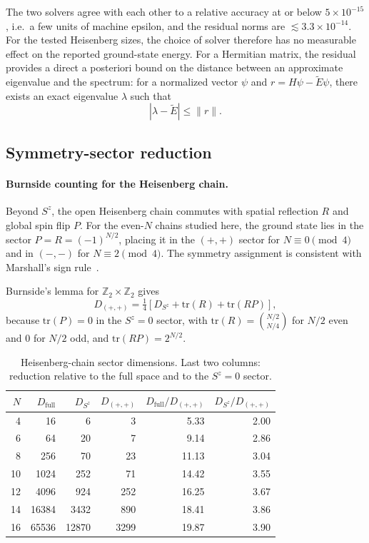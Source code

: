 \documentclass[pdflatex,sn-mathphys-num]{sn-jnl}
\begin{document}
The two solvers agree with each other to a relative accuracy at or
below $5 \times 10^{-15}$, i.e.\ a few units of machine epsilon, and
the residual norms are $\lesssim 3.3 \times 10^{-14}$. For the tested
Heisenberg sizes, the choice of solver therefore has no measurable
effect on the reported ground-state energy. For a Hermitian matrix,
the residual provides a direct a posteriori bound on the distance
between an approximate eigenvalue and the spectrum: for a normalized
vector $\psi$ and $r = H\psi - \tilde E\psi$, there exists an exact
eigenvalue $\lambda$ such that
\begin{equation}
|\lambda - \tilde E| \le \|r\|.
\label{eq:hermitian-bound}
\end{equation}

\subsection{Symmetry-sector reduction}
\label{sec:symmetry}

\paragraph{Burnside counting for the Heisenberg chain.}
Beyond $S^z$, the open Heisenberg chain commutes with spatial
reflection $R$ and global spin flip $P$. For the even-$N$ chains
studied here, the ground state lies in the sector
$P = R = (-1)^{N/2}$, placing it in the $(+,+)$ sector for
$N \equiv 0 \pmod 4$ and in $(-,-)$ for $N \equiv 2 \pmod 4$. The
symmetry assignment is consistent with Marshall's sign
rule~\cite{Marshall1955,LiebMattis1962}.

Burnside's lemma for $\mathbb{Z}_2\times\mathbb{Z}_2$ gives
\begin{equation}
D_{(+,+)} = \tfrac14\left[
  D_{S^z} + \mathrm{tr}(R) + \mathrm{tr}(RP) \right],
\label{eq:burnside}
\end{equation}
because $\mathrm{tr}(P) = 0$ in the $S^z=0$ sector, with
$\mathrm{tr}(R) = \binom{N/2}{N/4}$ for $N/2$ even and $0$ for $N/2$
odd, and $\mathrm{tr}(RP) = 2^{N/2}$.

\begin{table}[t]
\centering
\small
\caption{Heisenberg-chain sector dimensions. Last two columns:
reduction relative to the full space and to the $S^z=0$ sector.}
\label{tab:symmetry}
\begin{tabular}{rrrrrr}
\toprule
$N$ & $D_{\text{full}}$ & $D_{S^z}$ & $D_{(+,+)}$
    & $D_{\text{full}}/D_{(+,+)}$ & $D_{S^z}/D_{(+,+)}$ \\
\midrule
4  & 16    & 6     & 3    & 5.33  & 2.00 \\
6  & 64    & 20    & 7    & 9.14  & 2.86 \\
8  & 256   & 70    & 23   & 11.13 & 3.04 \\
10 & 1024  & 252   & 71   & 14.42 & 3.55 \\
12 & 4096  & 924   & 252  & 16.25 & 3.67 \\
14 & 16384 & 3432  & 890  & 18.41 & 3.86 \\
16 & 65536 & 12870 & 3299 & 19.87 & 3.90 \\
\bottomrule
\end{tabular}
\end{table}
\end{document}
